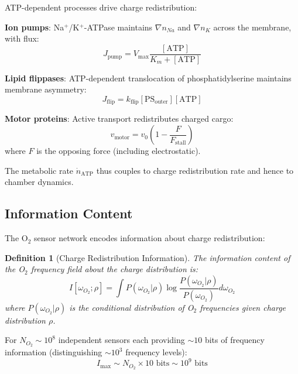 \documentclass[twocolumn,10pt,aps,prd,superscriptaddress,floatfix,nofootinbib]{revtex4-2}
\newtheorem{definition}[theorem]{Definition}
\theoremstyle{remark}
\begin{document}
ATP-dependent processes drive charge redistribution:

\textbf{Ion pumps}: Na$^+$/K$^+$-ATPase maintains $\nabla n_{Na}$ and $\nabla n_K$ across the membrane, with flux:
\begin{equation}
J_{\mathrm{pump}} = V_{\mathrm{max}}\frac{[\mathrm{ATP}]}{K_m + [\mathrm{ATP}]}
\end{equation}

\textbf{Lipid flippases}: ATP-dependent translocation of phosphatidylserine maintains membrane asymmetry:
\begin{equation}
J_{\mathrm{flip}} = k_{\mathrm{flip}}[\mathrm{PS}_{\mathrm{outer}}][\mathrm{ATP}]
\end{equation}

\textbf{Motor proteins}: Active transport redistributes charged cargo:
\begin{equation}
v_{\mathrm{motor}} = v_0\left(1 - \frac{F}{F_{\mathrm{stall}}}\right)
\end{equation}
where $F$ is the opposing force (including electrostatic).

The metabolic rate $\dot{n}_{\mathrm{ATP}}$ thus couples to charge redistribution rate and hence to chamber dynamics.

\subsection{Information Content}

The O$_2$ sensor network encodes information about charge redistribution:

\begin{definition}[Charge Redistribution Information]
\label{def:charge_info}
The information content of the O$_2$ frequency field about the charge distribution is:
\begin{equation}
I[\omega_{O_2}; \rho] = \int P(\omega_{O_2}|\rho) \log\frac{P(\omega_{O_2}|\rho)}{P(\omega_{O_2})} d\omega_{O_2}
\label{eq:mutual_info}
\end{equation}
where $P(\omega_{O_2}|\rho)$ is the conditional distribution of O$_2$ frequencies given charge distribution $\rho$.
\end{definition}

For $N_{O_2} \sim 10^8$ independent sensors each providing $\sim 10$ bits of frequency information (distinguishing $\sim 10^3$ frequency levels):
\begin{equation}
I_{\mathrm{max}} \sim N_{O_2} \times 10 \text{ bits} \sim 10^9 \text{ bits}
\end{equation}
\end{document}
